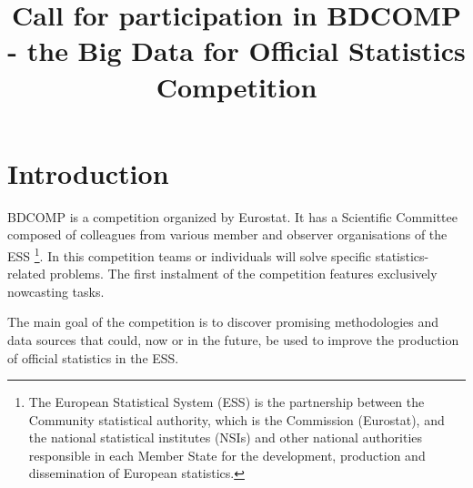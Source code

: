 \documentclass[12pt]{article}
\title{Call for participation in BDCOMP - the Big Data for Official Statistics Competition}
\begin{document}
\maketitle

\section{Introduction}
BDCOMP is a competition organized by Eurostat. It has a Scientific Committee composed of colleagues from various member and observer organisations of the ESS \footnote{The European Statistical System (ESS) is the partnership between the Community statistical authority, which is the Commission (Eurostat), and the national statistical institutes (NSIs) and other national authorities responsible in each Member State for the development, production and dissemination of European statistics.}. In this competition teams or individuals will solve specific statistics-related problems. The first instalment of the competition features exclusively nowcasting tasks.


The main goal of the competition is to discover promising methodologies and data sources that could, now or in the future, be used to improve the production of official statistics in the ESS.



\end{document}
